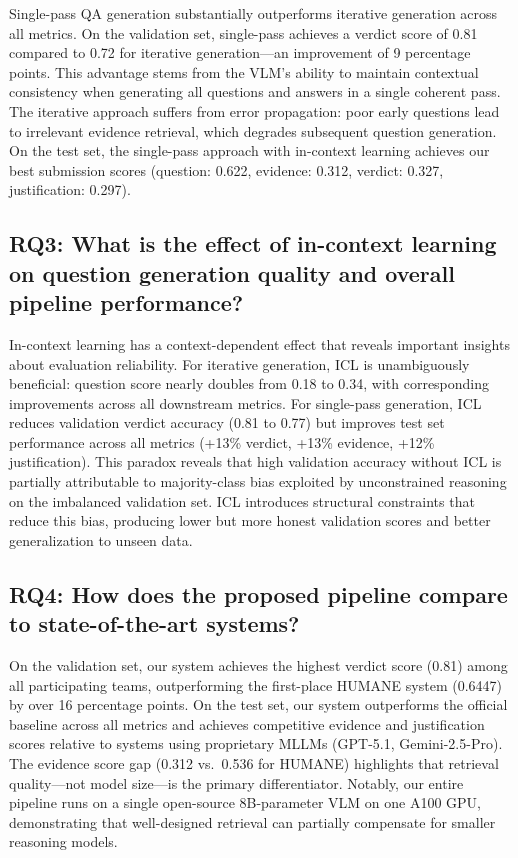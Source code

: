 Single-pass QA generation substantially outperforms iterative generation across all metrics. On the validation set, single-pass achieves a verdict score of 0.81 compared to 0.72 for iterative generation---an improvement of 9 percentage points. This advantage stems from the VLM's ability to maintain contextual consistency when generating all questions and answers in a single coherent pass. The iterative approach suffers from error propagation: poor early questions lead to irrelevant evidence retrieval, which degrades subsequent question generation. On the test set, the single-pass approach with in-context learning achieves our best submission scores (question: 0.622, evidence: 0.312, verdict: 0.327, justification: 0.297).

\subsection*{RQ3: What is the effect of in-context learning on question generation quality and overall pipeline performance?}

In-context learning has a context-dependent effect that reveals important insights about evaluation reliability. For iterative generation, ICL is unambiguously beneficial: question score nearly doubles from 0.18 to 0.34, with corresponding improvements across all downstream metrics. For single-pass generation, ICL reduces validation verdict accuracy (0.81 to 0.77) but improves test set performance across all metrics (+13\% verdict, +13\% evidence, +12\% justification). This paradox reveals that high validation accuracy without ICL is partially attributable to majority-class bias exploited by unconstrained reasoning on the imbalanced validation set. ICL introduces structural constraints that reduce this bias, producing lower but more honest validation scores and better generalization to unseen data.

\subsection*{RQ4: How does the proposed pipeline compare to state-of-the-art systems?}

On the validation set, our system achieves the highest verdict score (0.81) among all participating teams, outperforming the first-place HUMANE system (0.6447) by over 16 percentage points. On the test set, our system outperforms the official baseline across all metrics and achieves competitive evidence and justification scores relative to systems using proprietary MLLMs (GPT-5.1, Gemini-2.5-Pro). The evidence score gap (0.312 vs.\ 0.536 for HUMANE) highlights that retrieval quality---not model size---is the primary differentiator. Notably, our entire pipeline runs on a single open-source 8B-parameter VLM on one A100 GPU, demonstrating that well-designed retrieval can partially compensate for smaller reasoning models.

